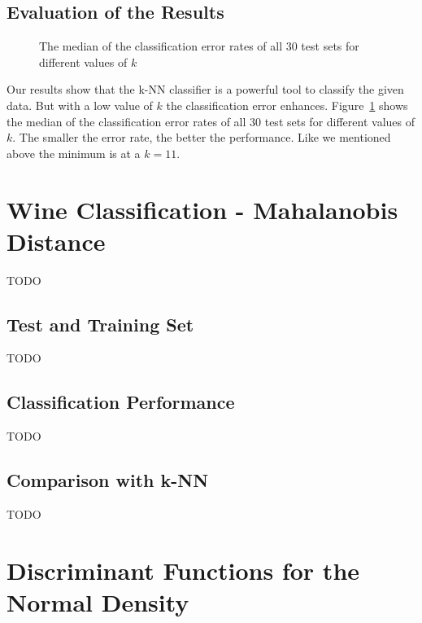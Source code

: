 \documentclass[subfigure,epsfig,fleqn,amssmb,float,caption,ausarbeitung]{scrartcl}
\begin{document}
\subsection{Evaluation of the Results}
\label{sec:kNNResults}

\begin{figure}
	\centering
	\setlength\figureheight{6cm} 
	\setlength\figurewidth{7cm}
	
	\caption{The median of the classification error rates of all 30 test sets for different values of $k$}
	\label{fig:ks}
\end{figure}

Our results show that the k-NN classifier is a powerful tool to classify the 
given data. But with a low value of $k$ the classification error enhances. Figure~\ref{fig:ks} shows the median of the classification error rates of all 30 test sets for different values of $k$. The smaller the error rate, the better the performance. Like we mentioned above the minimum is at a $k=11$.


\section{Wine Classification - Mahalanobis Distance}
\label{sec:Mahalanobis}

TODO


\subsection{Test and Training Set}
\label{sec:MahalanobisTestSet}

TODO


\subsection{Classification Performance}
\label{sec:MahalanobisPerformance}

TODO


\subsection{Comparison with k-NN}
\label{sec:MahalanobisComparison}

TODO


\section{Discriminant Functions for the Normal Density}
\label{sec:DiscriminantFunctions}
\end{document}
